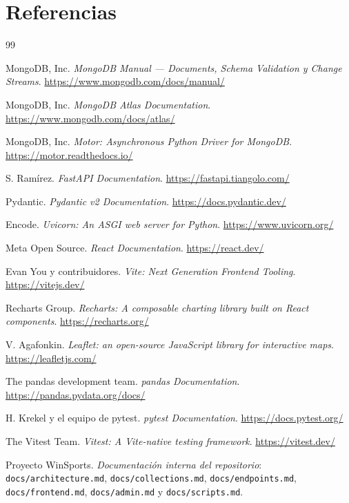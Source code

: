 \documentclass[12pt, letterpaper]{article}
\begin{document}
\section{Referencias}
\renewcommand{\refname}{}
\begin{thebibliography}{99}

 MongoDB, Inc.
  \emph{MongoDB Manual — Documents, Schema Validation y Change Streams}.
  \url{https://www.mongodb.com/docs/manual/}

 MongoDB, Inc.
  \emph{MongoDB Atlas Documentation}.
  \url{https://www.mongodb.com/docs/atlas/}

 MongoDB, Inc.
  \emph{Motor: Asynchronous Python Driver for MongoDB}.
  \url{https://motor.readthedocs.io/}

 S. Ramírez.
  \emph{FastAPI Documentation}.
  \url{https://fastapi.tiangolo.com/}

 Pydantic.
  \emph{Pydantic v2 Documentation}.
  \url{https://docs.pydantic.dev/}

 Encode.
  \emph{Uvicorn: An ASGI web server for Python}.
  \url{https://www.uvicorn.org/}

 Meta Open Source.
  \emph{React Documentation}.
  \url{https://react.dev/}

 Evan You y contribuidores.
  \emph{Vite: Next Generation Frontend Tooling}.
  \url{https://vitejs.dev/}

 Recharts Group.
  \emph{Recharts: A composable charting library built on React components}.
  \url{https://recharts.org/}

 V. Agafonkin.
  \emph{Leaflet: an open-source JavaScript library for interactive maps}.
  \url{https://leafletjs.com/}

 The pandas development team.
  \emph{pandas Documentation}.
  \url{https://pandas.pydata.org/docs/}

 H. Krekel y el equipo de pytest.
  \emph{pytest Documentation}.
  \url{https://docs.pytest.org/}

 The Vitest Team.
  \emph{Vitest: A Vite-native testing framework}.
  \url{https://vitest.dev/}

 Proyecto WinSports.
  \emph{Documentación interna del repositorio}:
  \texttt{docs/architecture.md}, \texttt{docs/collections.md},
  \texttt{docs/endpoints.md}, \texttt{docs/frontend.md},
  \texttt{docs/admin.md} y \texttt{docs/scripts.md}.

\end{thebibliography}
\end{document}

